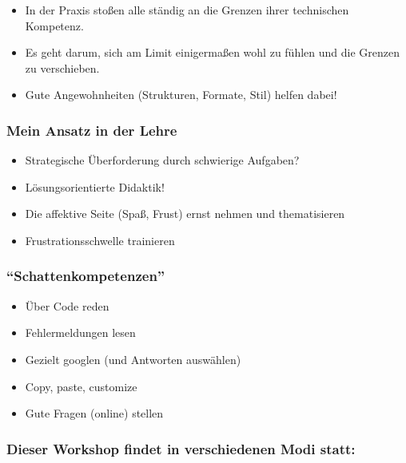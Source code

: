 \documentclass[11pt,german,a4paper]{article}
\providecommand{\tightlist}{%
  \setlength{\itemsep}{0pt}\setlength{\parskip}{0pt}}
\begin{document}
\begin{itemize}
\tightlist
\item
  In der Praxis stoßen alle ständig an die Grenzen ihrer technischen Kompetenz.
\item
  Es geht darum, sich am Limit einigermaßen wohl zu fühlen und die Grenzen zu verschieben.
\item
  Gute Angewohnheiten (Strukturen, Formate, Stil) helfen dabei!
\end{itemize}

\hypertarget{mein-ansatz-in-der-lehre}{%
\subsubsection{Mein Ansatz in der Lehre}\label{mein-ansatz-in-der-lehre}}

\begin{itemize}
\tightlist
\item
  Strategische Überforderung durch schwierige Aufgaben?
\item
  Lösungsorientierte Didaktik!
\item
  Die affektive Seite (Spaß, Frust) ernst nehmen und thematisieren
\item
  Frustrationsschwelle trainieren
\end{itemize}

\hypertarget{schattenkompetenzen}{%
\subsubsection{``Schattenkompetenzen''}\label{schattenkompetenzen}}

\begin{itemize}
\tightlist
\item
  Über Code reden
\item
  Fehlermeldungen lesen
\item
  Gezielt googlen (und Antworten auswählen)
\item
  Copy, paste, customize
\item
  Gute Fragen (online) stellen
\end{itemize}

\hypertarget{dieser-workshop-findet-in-verschiedenen-modi-statt}{%
\subsubsection{Dieser Workshop findet in verschiedenen Modi statt:}\label{dieser-workshop-findet-in-verschiedenen-modi-statt}}
\end{document}
